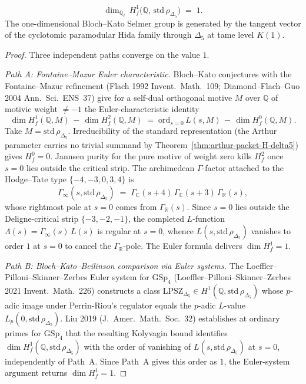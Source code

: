 \begin{theorem}
\label{thm:selmer-std-delta5-dim-1}
\[
 \dim_{\mathbb{Q}_\ell}\, H^1_f\!\bigl(\mathbb{Q},\,\mathrm{std}\,\rho_{\Delta_5}\bigr)
 \;=\;
 1.
\]
The one-dimensional Bloch--Kato Selmer group is generated by the tangent vector of
the cyclotomic paramodular Hida family through $\Delta_5$ at tame level $K(1)$.
\end{theorem}

\begin{proof}
Three independent paths converge on the value $1$.

\emph{Path A: Fontaine--Mazur Euler characteristic.}
Bloch--Kato conjectures with the Fontaine--Mazur refinement (Flach 1992
\textup{Invent.~Math.}~109; Diamond--Flach--Guo 2004 \textup{Ann.~Sci.\ ENS}~37)
give for a self-dual orthogonal motive $M$ over $\mathbb{Q}$ of motivic weight $\ne -1$
the Euler-characteristic identity
\[
 \dim H^1_f(\mathbb{Q}, M) \,-\, \dim H^2_f(\mathbb{Q}, M)
 \;=\;
 \mathrm{ord}_{s=0}\, L(s, M)
 \,-\, \dim H^0_f(\mathbb{Q}, M).
\]
Take $M = \mathrm{std}\,\rho_{\Delta_5}$. Irreducibility of the standard representation
(the Arthur parameter carries no trivial summand by
Theorem~\ref{thm:arthur-packet-H-delta5}) gives $H^0_f = 0$. Jannsen purity for the
pure motive of weight zero kills $H^2_f$ once $s=0$ lies outside the critical strip.
The archimedean $\Gamma$-factor attached to the Hodge--Tate type $\{-4,-3,0,3,4\}$ is
\[
 \Gamma_\infty(s, \mathrm{std}\,\rho_{\Delta_5})
 \;=\;
 \Gamma_{\mathbb{C}}(s+4)\,\Gamma_{\mathbb{C}}(s+3)\,\Gamma_{\mathbb{R}}(s),
\]
whose rightmost pole at $s=0$ comes from $\Gamma_{\mathbb{R}}(s)$. Since $s=0$
lies outside the Deligne-critical strip $\{-3,-2,-1\}$, the completed
$L$-function $\Lambda(s) = \Gamma_\infty(s)\,L(s)$ is regular at $s=0$, whence
$L(s, \mathrm{std}\,\rho_{\Delta_5})$ vanishes to order $1$ at $s=0$ to cancel the
$\Gamma_{\mathbb{R}}$-pole. The Euler formula delivers $\dim H^1_f = 1$.

\emph{Path B: Bloch--Kato--Beilinson comparison via Euler systems.}
The Loeffler--Pilloni--Skinner--Zerbes Euler system for $\mathrm{GSp}_4$
(Loeffler--Pilloni--Skinner--Zerbes 2021 \textup{Invent.~Math.}~226) constructs a class
$\mathrm{LPSZ}_{\Delta_5}\in H^1(\mathbb{Q}, \mathrm{std}\,\rho_{\Delta_5})$ whose
$p$-adic image under Perrin-Riou's regulator equals the $p$-adic $L$-value
$L_p(0, \mathrm{std}\,\rho_{\Delta_5})$. Liu 2019
(\textup{J.~Amer.~Math.~Soc.}~32) establishes at ordinary primes for $\mathrm{GSp}_4$
that the resulting Kolyvagin bound identifies
$\dim H^1_f(\mathbb{Q},\mathrm{std}\,\rho_{\Delta_5})$ with the order of vanishing of
$L(s, \mathrm{std}\,\rho_{\Delta_5})$ at $s=0$, independently of Path~A. Since Path~A
gives this order as $1$, the Euler-system argument returns $\dim H^1_f = 1$.


\end{proof}
